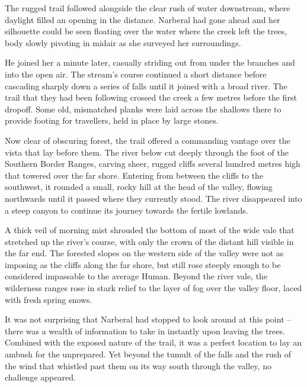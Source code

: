  

The rugged trail followed alongside the clear rush of water downstream, where daylight filled an opening in the distance. Narberal had gone ahead and her silhouette could be seen floating over the water where the creek left the trees, body slowly pivoting in midair as she surveyed her surroundings.

 

He joined her a minute later, casually striding out from under the branches and into the open air. The stream’s course continued a short distance before cascading sharply down a series of falls until it joined with a broad river. The trail that they had been following crossed the creek a few metres before the first dropoff. Some old, mismatched planks were laid across the shallows there to provide footing for travellers, held in place by large stones.

 

Now clear of obscuring forest, the trail offered a commanding vantage over the vista that lay before them. The river below cut deeply through the foot of the Southern Border Ranges, carving sheer, rugged cliffs several hundred metres high that towered over the far shore. Entering from between the cliffs to the southwest, it rounded a small, rocky hill at the head of the valley, flowing northwards until it passed where they currently stood. The river disappeared into a steep canyon to continue its journey towards the fertile lowlands.

 

A thick veil of morning mist shrouded the bottom of most of the wide vale that stretched up the river’s course, with only the crown of the distant hill visible in the far end. The forested slopes on the western side of the valley were not as imposing as the cliffs along the far shore, but still rose steeply enough to be considered impassable to the average Human. Beyond the river vale, the wilderness ranges rose in stark relief to the layer of fog over the valley floor, laced with fresh spring snows.

 

It was not surprising that Narberal had stopped to look around at this point – there was a wealth of information to take in instantly upon leaving the trees. Combined with the exposed nature of the trail, it was a perfect location to lay an ambush for the unprepared. Yet beyond the tumult of the falls and the rush of the wind that whistled past them on its way south through the valley, no challenge appeared.

